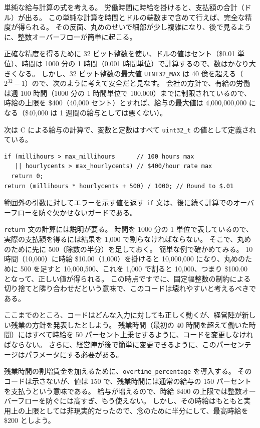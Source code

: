 \documentclass[uplatex]{jsarticle}
\begin{document}
単純な給与計算の式を考える。
労働時間に時給を掛けると、支払額の合計（ドル）が出る。
この単純な計算を時間とドルの端数まで含めて行えば、完全な精度が得られる。
その反面、丸めのせいで細部が少し複雑になり、後で見るように、整数オーバーフローが簡単に起こる。

正確な精度を得るために 32 ビット整数を使い、ドルの値はセント（\$0.01 単位）、時間は 1000 分の 1 時間（0.001 時間単位）で計算するので、数はかなり大きくなる。
しかし、32 ビット整数の最大値 \texttt{UINT32\_MAX} は 40 億を超える（$2^{32}-1$）ので、次のように考えて安全だと見なす。
会社の方針で、有給の労働は週 100 時間（1000 分の 1 時間単位で 100,000）までに制限されているので、時給の上限を \$400（40,000 セント）とすれば、給与の最大値は 4,000,000,000 になる（\$40,000 は 1 週間の給与としては悪くない）。

次は C による給与の計算で、変数と定数はすべて \texttt{uint32\_t} の値として定義されている。

\begin{verbatim}
if (millihours > max_millihours      // 100 hours max
   || hourlycents > max_hourlycents) // $400/hour rate max
  return 0;
return (millihours * hourlycents + 500) / 1000; // Round to $.01
\end{verbatim}

範囲外の引数に対してエラーを示す値を返す \texttt{if} 文は、後に続く計算でのオーバーフローを防ぐ欠かせないガードである。

\texttt{return} 文の計算には説明が要る。
時間を 1000 分の 1 単位で表しているので、実際の支払額を得るには結果を 1,000 で割らなければならない。
そこで、丸めのために先に 500（除数の半分）を足しておく。
簡単な例で確かめてみる。
10 時間（10,000）に時給 \$10.00（1,000）を掛けると 10,000,000 になり、丸めのために 500 を足すと 10,000,500、これを 1,000 で割ると 10,000、つまり \$100.00 となって、正しい値が得られる。
この時点ですでに、固定幅整数の制約による切り捨てと隣り合わせだという意味で、このコードは壊れやすいと考えるべきである。

ここまでのところ、コードはどんな入力に対しても正しく動くが、経営陣が新しい残業の方針を発表したとしよう。
残業時間（最初の 40 時間を超えて働いた時間）にはすべて時給を 50 パーセント上乗せするように、コードを変更しなければならない。
さらに、経営陣が後で簡単に変更できるように、このパーセンテージはパラメータにする必要がある。

残業時間の割増賃金を加えるために、\texttt{overtime\_percentage} を導入する。
そのコードは示さないが、値は 150 で、残業時間には通常の給与の 150 パーセントを支払うという意味である。
給与が増えるので、時給 \$400 の上限では整数オーバーフローを防ぐには高すぎ、もう使えない。
しかし、その時給はもともと実用上の上限としては非現実的だったので、念のために半分にして、最高時給を \$200 としよう。
\end{document}
